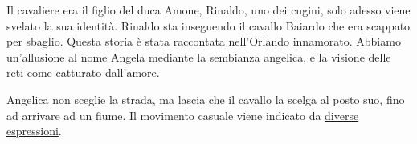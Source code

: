 \documentclass[a4paper]{article}
\begin{document}
Il cavaliere era il figlio del duca Amone, Rinaldo, uno dei cugini,
solo adesso viene svelato la sua identità.
Rinaldo sta inseguendo il cavallo Baiardo che era scappato per sbaglio.
Questa storia è stata raccontata nell'Orlando innamorato.
Abbiamo un'allusione al nome Angela mediante la sembianza angelica, e la visione
delle reti come catturato dall'amore.

\begin{center} %
\begin{minipage}{0.5\textwidth}
\centering
{}
\end{minipage}
\end{center}

Angelica non sceglie la strada, ma lascia che il cavallo la scelga al posto suo,
fino ad arrivare ad un fiume.
Il movimento casuale viene indicato da \underline{diverse espressioni}.

\begin{center} %
\begin{minipage}{0.5\textwidth}
\centering
{}
\end{minipage}
\end{center}
\end{document}
